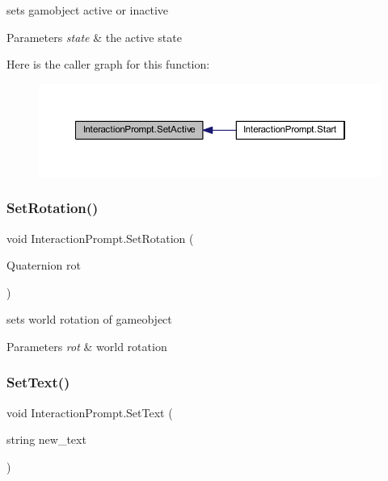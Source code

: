 sets gamobject active or inactive 


\begin{DoxyParams}{Parameters}
{\em state} & the active state\\
\hline
\end{DoxyParams}
Here is the caller graph for this function\+:
\nopagebreak
\begin{figure}[H]
\begin{center}
\leavevmode
\includegraphics[width=350pt]{class_interaction_prompt_a409ac8c36942c10be65238a7281932c2_icgraph}
\end{center}
\end{figure}
\mbox{\label{class_interaction_prompt_a88851b5b82c1413a6aad2c02d24708f6}} 
\subsubsection{\texorpdfstring{Set\+Rotation()}{SetRotation()}}
{\footnotesize\ttfamily void Interaction\+Prompt.\+Set\+Rotation (\begin{DoxyParamCaption}\item[{Quaternion}]{rot }\end{DoxyParamCaption})}



sets world rotation of gameobject 


\begin{DoxyParams}{Parameters}
{\em rot} & world rotation\\
\hline
\end{DoxyParams}
\mbox{\label{class_interaction_prompt_ac68329e8bcb18bc4556695f506d5b410}} 
\subsubsection{\texorpdfstring{Set\+Text()}{SetText()}}
{\footnotesize\ttfamily void Interaction\+Prompt.\+Set\+Text (\begin{DoxyParamCaption}\item[{string}]{new\+\_\+text }\end{DoxyParamCaption})}



